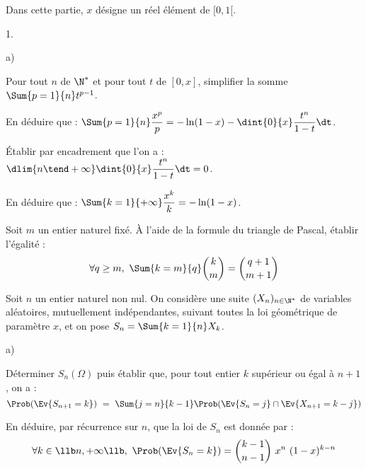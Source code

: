 \documentclass[11pt]{article}%
\begin{document}
\noindent
Dans cette partie, $x$ désigne un réel élément de $[0,1[$.
\begin{noliste}{1.}
  \setlength{\itemsep}{4mm}
\item
  \begin{noliste}{a)}
    \setlength{\itemsep}{2mm}
  \item Pour tout $n$ de $\N^*$ et pour tout $t$ de $[0,x]$,
    simplifier la somme $\Sum{p = 1}{n} t^{p-1}$.

    




  \item En déduire que : $\Sum{p = 1}{n}\dfrac{x^{p}}{p} = - \ln(1-x)
    - \dint{0}{x} \dfrac{t^n}{1-t} \dt$.

    

  \item Établir par encadrement que l'on a : $\dlim{n \tend +\infty}
    \dint{0}{x} \dfrac{t^n}{1-t} \dt = 0$.
    

  \item En déduire que : $\Sum{k = 1}{+ \infty}\dfrac{x^k}{k} =
    -\ln(1-x)$.

    

  \end{noliste}




\item Soit $m$ un entier naturel fixé. À l'aide de la formule du
  triangle de Pascal, établir l'égalité :
  \[
  \forall q \geq m, \ \Sum{k = m}{q} \dbinom{k}{m} = \dbinom{q + 1}{m
    + 1}
  \]

  
  
\item Soit $n$ un entier naturel non nul. On considère une suite
  $(X_n)_{n\in\N^{*}}$ de variables aléatoires, mutuellement
  indépendantes, suivant toutes la loi géométrique de paramètre $x$,
  et on pose $S_n = \Sum{k = 1}{n}X_k$.
  \begin{noliste}{a)}
    \setlength{\itemsep}{2mm}
  \item Déterminer $S_n(\Omega)$ puis établir que, pour tout entier
    $k$ supérieur ou égal à $n + 1$, on a :
    \[
    \Prob(\Ev{S_{n + 1} = k}) \ = \ \Sum{j = n}{k-1} \Prob(\Ev{S_n =
      j} \cap \Ev{X_{n + 1} = k-j})
    \]

    

  \item En déduire, par récurrence sur $n$, que la loi de $S_n$ est
    donnée par :
    \[
    \forall k \in \llb n, + \infty \llb, \ \Prob(\Ev{S_n = k}) =
    \dbinom{k-1}{n-1} \ x^n \ (1-x)^{k-n}
    \]


\end{noliste}
\end{noliste}
\end{document}
